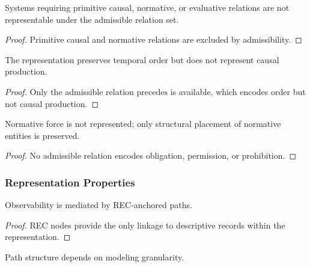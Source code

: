 \begin{proposition}
\label{prop:admissibility_boundary}
Systems requiring primitive causal, normative, or evaluative relations
are not representable under the admissible relation set.
\end{proposition}

\begin{proof}
Primitive causal and normative relations are excluded by admissibility.
\end{proof}

\begin{proposition}
\label{prop:causal_nonrepresentability}
The representation preserves temporal order but does not represent causal production.
\end{proposition}

\begin{proof}
Only the admissible relation $\mathrm{precedes}$ is available,
which encodes order but not causal production.
\end{proof}

\begin{proposition}
\label{prop:normative_nonrepresentability}
Normative force is not represented; only structural placement of normative entities is preserved.
\end{proposition}

\begin{proof}
No admissible relation encodes obligation, permission, or prohibition.
\end{proof}

\subsubsection{Representation Properties}

\begin{proposition}
\label{prop:rec_dependence}
Observability is mediated by REC-anchored paths.
\end{proposition}

\begin{proof}
REC nodes provide the only linkage to descriptive records within the representation.
\end{proof}

\begin{proposition}
\label{prop:granularity_dependence}
Path structure depends on modeling granularity.
\end{proposition}

